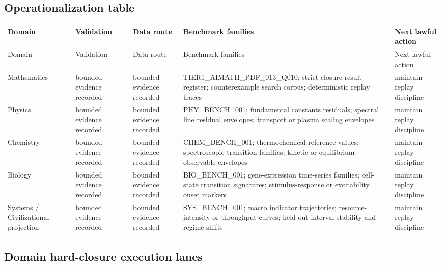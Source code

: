 \subsection{Operationalization table}
\begin{longtable}{p{}p{}p{}p{}p{}}
\toprule
Domain & Validation & Data route & Benchmark families & Next lawful action \\
\midrule
\endfirsthead
\toprule
Domain & Validation & Data route & Benchmark families & Next lawful action \\
\midrule
\endhead
Mathematics & bounded evidence recorded & bounded evidence recorded & TIER1\_AIMATH\_PDF\_013\_Q010; strict closure result register; counterexample search corpus; deterministic replay traces & maintain replay discipline \\
Physics & bounded evidence recorded & bounded evidence recorded & PHY\_BENCH\_001; fundamental constants residuals; spectral line residual envelopes; transport or plasma scaling envelopes & maintain replay discipline \\
Chemistry & bounded evidence recorded & bounded evidence recorded & CHEM\_BENCH\_001; thermochemical reference values; spectroscopic transition families; kinetic or equilibrium observable envelopes & maintain replay discipline \\
Biology & bounded evidence recorded & bounded evidence recorded & BIO\_BENCH\_001; gene-expression time-series families; cell-state transition signatures; stimulus-response or excitability onset markers & maintain replay discipline \\
Systems / Civilizational projection & bounded evidence recorded & bounded evidence recorded & SYS\_BENCH\_001; macro indicator trajectories; resource-intensity or throughput curves; held-out interval stability and regime shifts & maintain replay discipline \\
\bottomrule
\end{longtable}

\subsection{Domain hard-closure execution lanes}
